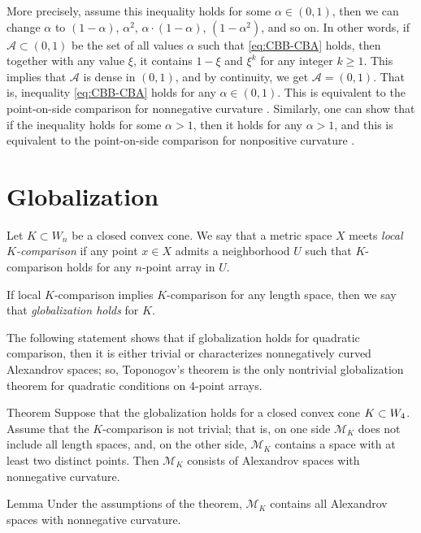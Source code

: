 \documentclass[a4paper,10pt]{article}
\begin{document}
More precisely, assume this inequality holds for some $\alpha\in (0,1)$,
then we can change $\alpha$ to $(1-\alpha)$, $\alpha^2$,  $\alpha\cdot (1-\alpha)$, $(1-\alpha^2)$, and so on.
In other words, if $\mathcal{A}\subset(0,1)$ be the set of all values $\alpha$ such that \ref{eq:CBB-CBA} holds, then together with any value $\xi$, it contains $1-\xi$ and $\xi^k$ for any integer $k\ge 1$.
This implies that $\mathcal{A}$ is dense in $(0,1)$, and by continuity, we get $\mathcal{A}=(0,1)$.
That is, inequality \ref{eq:CBB-CBA} holds for any $\alpha\in (0,1)$.
This is equivalent to the point-on-side comparison for nonnegative curvature \cite[8.14]{AKP-2024}.
Similarly, one can show that if the inequality holds for some $\alpha>1$, then it holds for any $\alpha>1$,
and this is equivalent to the point-on-side comparison for nonpositive curvature \cite[9.14]{AKP-2024}.
\qeds

\section{Globalization}\label{par:globalization}

Let $K\subset W_n$ be a closed convex cone.
We say that a metric space $X$ meets \emph{local $K$-comparison} if any point $x\in X$ admits a neighborhood $U$ such that $K$-comparison holds for any $n$-point array in $U$.

If local $K$-comparison implies $K$-comparison for any length space, then we say that \emph{globalization holds} for $K$.

The following statement shows that if globalization holds for quadratic comparison, then it is either trivial or characterizes nonnegatively curved Alexandrov spaces;
so, Toponogov's theorem is the only nontrivial globalization theorem for quadratic conditions on 4-point arrays.

\begin{thm}{Theorem}\label{thm:globalization}
Suppose that the globalization holds for a closed convex cone $K\z\subset W_4$.
Assume that the $K$-comparison is not trivial;
that is, on one side $\mathcal{M}_K$ does not include all length spaces, and, on the other side, $\mathcal{M}_K$ contains a space with at least two distinct points.
Then $\mathcal{M}_K$ consists of Alexandrov spaces with nonnegative curvature.
\end{thm}

\begin{thm}{Lemma}\label{lem:globalization}
Under the assumptions of the theorem, $\mathcal{M}_K$ contains all Alexandrov spaces with nonnegative curvature.
\end{thm}
\end{document}
